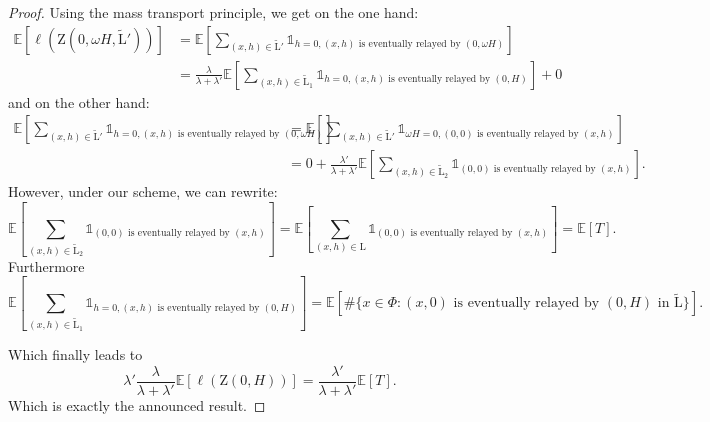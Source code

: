 \documentclass[10pt,a4paper]{amsart}
\newcommand{\e}{\mathbb{E}}
\newcommand{\landsc}{\mathrm{L}}
\newcommand{\zone}{\mathrm{Z}}
\begin{document}
\begin{proof}
Using the mass transport principle, we get on the one hand:
\begin{align*}
    \e[\ell(\zone(0,\omega H, \tilde{\landsc}'))] &= \e\left[\sum_{(x, h)\in \tilde{\landsc}'} \mathds{1}_{h = 0, (x, h) \text{ is eventually relayed by } (0, \omega H)}\right]\\
    &= \frac{\lambda}{\lambda+\lambda'}\e\left[\sum_{(x, h)\in \tilde{\landsc}_1} \mathds{1}_{h = 0, (x, h) \text{ is eventually relayed by } (0,  H)}\right]+ 0
\end{align*}
and on the other hand:
\begin{align*}
    \e\left[\sum_{(x, h)\in \tilde{\landsc}'} \mathds{1}_{h = 0, (x, h) \text{ is eventually relayed by } (0, \omega H)}\right]&= \e\left[\sum_{(x, h)\in \tilde{\landsc}'} \mathds{1}_{\omega H= 0, (0, 0) \text{ is eventually relayed by } (x, h)}\right]\\
    &= 0+ \frac{\lambda'}{\lambda+\lambda'}\e\left[\sum_{(x, h)\in \tilde{\landsc}_2} \mathds{1}_{(0, 0) \text{ is eventually relayed by } (x,  h)}\right].
\end{align*}
However, under our scheme, we can rewrite:
\[\e\left[\sum_{(x, h)\in \tilde{\landsc}_2} \mathds{1}_{(0, 0) \text{ is eventually relayed by } (x,  h)}\right] = \e\left[\sum_{(x, h)\in \landsc} \mathds{1}_{(0, 0) \text{ is eventually relayed by } (x,  h)}\right] = \e[T].\]
Furthermore
\[\e\left[\sum_{(x, h)\in \tilde{\landsc}_1} \mathds{1}_{h = 0, (x, h) \text{ is eventually relayed by } (0,  H)}\right] = \e[\# \{x\in \Phi: (x, 0)\text{ is eventually relayed by } (0, H) \text{ in }\tilde{\landsc}\}].\]

Which finally leads to 
\[\lambda' \frac{\lambda}{\lambda+\lambda'} \e[\ell(\zone(0, H))] = \frac{\lambda'}{\lambda+\lambda'} \e[T].\]
Which is exactly the announced result.
\end{proof}
\end{document}
